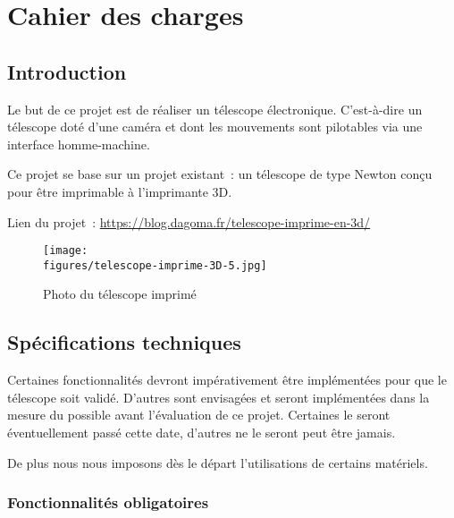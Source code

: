 \chapter{Cahier des charges}
\label{chapter1}





\section{Introduction}

Le but de ce projet est de réaliser un télescope électronique. C'est-à-dire un télescope doté d'une caméra et dont les mouvements sont pilotables via une interface homme-machine.

\vspace{1cm}

Ce projet se base sur un projet existant~: un télescope de type Newton conçu pour être imprimable à l'imprimante 3D.

Lien du projet~: \url{https://blog.dagoma.fr/telescope-imprime-en-3d/}

\begin{figure}[H]
	\centering
    \texttt{[image: \\figures/telescope-imprime-3D-5.jpg]}
    \decoRule
    \caption[
    Photo du télescope imprimé]{
    Photo du télescope imprimé}
    \label{fig:Photo du télescope imprimé}
	\end{figure}



\section{Spécifications techniques}

Certaines fonctionnalités devront impérativement être implémentées pour que le télescope soit validé. D'autres sont envisagées et seront implémentées dans la mesure du possible avant l'évaluation de ce projet. Certaines le seront éventuellement passé cette date, d'autres ne le seront peut être jamais.

De plus nous nous imposons dès le départ l'utilisations de certains matériels.

\subsection{Fonctionnalités obligatoires}

